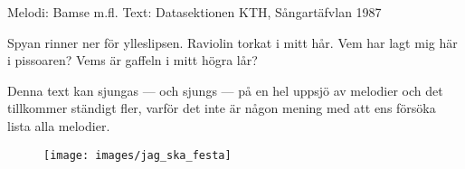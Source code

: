 \begin{song}

\begin{songmeta}
Melodi: Bamse m.fl.
Text: Datasektionen KTH, Sångartäfvlan 1987
\end{songmeta}

\begin{songtext}
Spyan rinner ner för ylleslipsen.
Raviolin torkat i mitt hår.
Vem har lagt mig här i pissoaren?
Vems är gaffeln i mitt högra lår?
\end{songtext}

\begin{songnotes}
Denna text kan sjungas --- och sjungs --- på en hel uppsjö av melodier och det tillkommer ständigt fler,
varför det inte är någon mening med att ens försöka lista alla melodier.
\end{songnotes}

\begin{figure}[h!]
  \centering
  \texttt{[image: images/jag\_ska\_festa]}
\end{figure}

\end{song}

